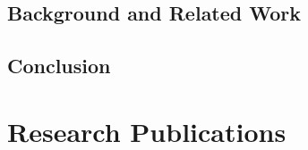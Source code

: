 \section{Background and Related Work}



\section{Conclusion}

\chapter{Research Publications}


%
%
%
%
%
%
%
%
%
%
%
